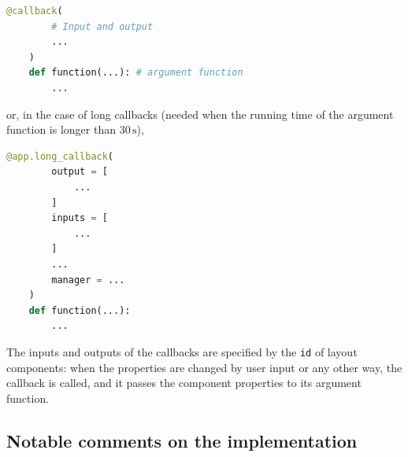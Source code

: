 \begin{center}
    \begin{lstlisting}[language = Python]
    @callback(
        # Input and output
        ...
    )
    def function(...): # argument function
        ... 
    \end{lstlisting}
\end{center}


or, in the case of long callbacks (needed when the running time of the argument function is longer than $30 \, \mathrm s$),

\begin{center}
    \begin{lstlisting}[language = Python]
    @app.long_callback(
        output = [
            ...
        ]
        inputs = [
            ...
        ]
        ...
        manager = ... 
    )
    def function(...):
        ...
    \end{lstlisting}
\end{center}


The inputs and outputs of the callbacks are specified by the \texttt{id} of layout components: when the properties are changed by user input or any other way, the 
callback is called, and it passes the component properties to its argument function.

\subsection{Notable comments on the implementation}

